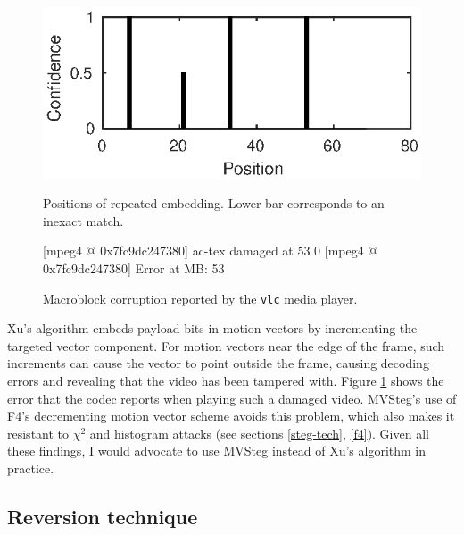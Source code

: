 \documentclass[12pt,british,twoside,notitlepage,usenames,dvipsnames,hypens,final]{report}
\numberwithin{equation}{section}
\numberwithin{figure}{section}
\renewenvironment{alltt}{\vspace{-0.6\baselineskip}\begin{oldalltt}}{\end{oldalltt}\vspace{-0.1\baselineskip}}
\begin{document}
\begin{figure}[tbh]
\centering
\begin{minipage}[t]{.45\textwidth}
  \centering
  \includegraphics[scale=0.9]{img/4xembed.eps}
  \caption{Positions of repeated embedding. Lower bar corresponds to an inexact match.}
  \label{fig:4xembed}
\end{minipage}%
\quad
\begin{minipage}[t]{.45\textwidth}
  \vspace{-5.14em}
  \begingroup
    \fontsize{11pt}{12pt}\selectfont
    \centering
    \begin{alltt}
 {\color{blue}[mpeg4 @ 0x7fc9dc247380]}
            {\color{red}ac-tex damaged at 53 0}
 {\color{blue}[mpeg4 @ 0x7fc9dc247380]}
                   {\color{red}Error at MB: 53}

    \end{alltt}
  \endgroup
  \caption{Macroblock corruption reported by the \texttt{vlc} media player.}
  \label{fig:vlc-corruption}
\end{minipage}
\end{figure}

Xu's algorithm embeds payload bits in motion vectors by incrementing the targeted vector component. For motion vectors near the edge of the frame, such increments can cause the vector to point outside the frame, causing decoding errors and revealing that the video has been tampered with. Figure \ref{fig:vlc-corruption} shows the error that the codec reports when playing such a damaged video. MVSteg's use of F4's decrementing motion vector scheme avoids this problem, which also makes it resistant to $\chi^2$ and histogram attacks (see sections \ref{steg-tech}, \ref{f4}). Given all these findings, I would advocate to use MVSteg instead of Xu's algorithm in practice.

\subsection{Reversion technique}
\label{rev-tech}
\end{document}
